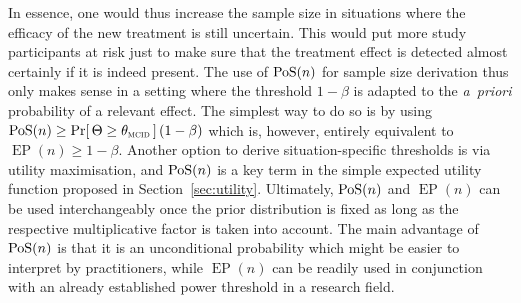 \documentclass{article}
\renewcommand{\Pr}{\operatorname{Pr}}
\newcommand{\EP}{\operatorname{EP}}
\begin{document}
In essence, one would thus increase the sample size in situations where the efficacy of the new treatment is still uncertain.
This would put more study participants at risk just to make sure that the treatment effect is detected almost certainly if it is indeed present.
The use of $\operatorname{PoS}(n)$ for sample size derivation thus only makes sense in a setting where the threshold $1 - \beta$ is adapted to the \textit{a~priori} probability of a relevant effect.
The simplest way to do so is by using $\PoS(n) \geq \Pr[\,\Theta\geq\mcid\,]\,(1 - \beta)$ which is, however, entirely equivalent to $\EP(n) \geq 1 - \beta$.
Another option to derive situation-specific thresholds is via utility maximisation, and $\operatorname{PoS}(n)$ is a key term in the simple expected utility function proposed in Section~\ref{sec:utility}.
Ultimately, $\operatorname{PoS}(n)$ and $\EP(n)$ can be used interchangeably once the prior distribution is fixed as long as the respective multiplicative factor is taken into account.
The main advantage of $\operatorname{PoS}(n)$ is that it is an unconditional probability
which might be easier to interpret by practitioners, while $\EP(n)$ can be readily used in conjunction with an already established power threshold in a research field.
\end{document}

